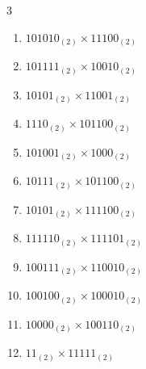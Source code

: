\begin{multicols}{3}
\begin{enumerate}

  \item $101010_{(2)} \times 11100_{(2)}$


\columnbreak %

  \item $101111_{(2)} \times 10010_{(2)}$


  \item $10101_{(2)} \times 11001_{(2)}$


  \item $1110_{(2)} \times 101100_{(2)}$


  \item $101001_{(2)} \times 1000_{(2)}$


  \item $10111_{(2)} \times 101100_{(2)}$


\columnbreak %

\resetques

  \item $10101_{(2)} \times 111100_{(2)}$


  \item $111110_{(2)} \times 111101_{(2)}$


  \item $100111_{(2)} \times 110010_{(2)}$


  \item $100100_{(2)} \times 100010_{(2)}$


  \item $10000_{(2)} \times 100110_{(2)}$


\columnbreak %

  \item $11_{(2)} \times 11111_{(2)}$


\end{enumerate}
\end{multicols}
